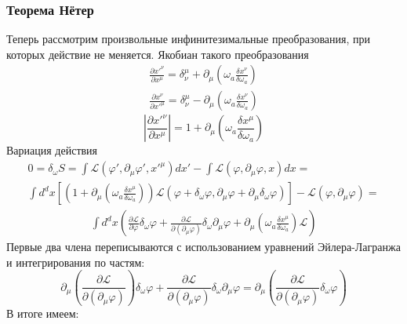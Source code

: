 \documentclass[a4paper,12pt]{article} \usepackage[utf8x]{inputenc} \usepackage[russian]{babel}
\theoremstyle{definition} \newtheorem{corollary}{Corollary}[theorem] \theoremstyle{definition}
\begin{document}
\subsubsection*{Теорема Нётер}
\label{sec:noether}

Теперь рассмотрим произвольные инфинитезимальные преобразования, при которых действие не меняется.
Якобиан такого преобразования
\begin{eqnarray*} \frac{\partial x'^{\nu}}{\partial x^{\mu}} =
\delta^{\mu}_{\nu}+\partial_{\mu}\left(\omega_a \frac{\delta x^{\nu}}{\delta \omega_a}\right)\\
\frac{\partial x^{\nu}}{\partial x'^{\mu}} = \delta^{\mu}_{\nu}-\partial_{\mu}\left(\omega_a
\frac{\delta x^{\nu}}{\delta \omega_a}\right)
\end{eqnarray*}
\begin{equation*} \left|\frac{\partial x'^{\nu}}{\partial x^{\mu}}\right| =
1+\partial_{\mu}\left(\omega_a \frac{\delta x^{\mu}}{\delta \omega_a}\right)
\end{equation*} Вариация действия
\begin{multline*} 0=\delta_{\omega} S=\int
\mathcal{L}(\varphi',\partial_{\mu}\varphi',x'^{\mu})dx'-\int
\mathcal{L}(\varphi,\partial_{\mu}\varphi,x)dx=\\ \int d^{d}x\left[ \left(
1+\partial_{\mu}\left(\omega_a \frac{\delta x^{\mu}}{\delta \omega_a}\right)\right) \mathcal{L}
\left(\varphi+\delta_{\omega}\varphi,
    \partial_{\mu}\varphi+\partial_{\mu}\delta_{\omega}\varphi\right)\right]-\mathcal{L}(\varphi,\partial_{\mu}\varphi)=
\end{multline*}
\begin{multline*} \int d^{d}x\left( \frac{\partial \mathcal{L}}{\partial \varphi}
\delta_{\omega}\varphi +\frac{\partial
\mathcal{L}}{\partial(\partial_{\mu}\varphi)}\delta_{\omega}\partial_{\mu}\varphi
+\partial_{\mu}\left(\omega_a \frac{\delta x^{\mu}}{\delta \omega_a}\right)\mathcal{L}\right)
\end{multline*} Первые два члена переписываются с использованием уравнений Эйлера-Лагранжа и
интегрирования по частям:
\begin{equation*}
  \partial_{\mu}\left(\frac{\partial \mathcal{L}}{\partial
(\partial_{\mu}\varphi)}\right)\delta_{\omega}\varphi+\frac{\partial \mathcal{L}}{\partial
(\partial_{\mu}\varphi)}\delta_{\omega}\partial_{\mu}\varphi=
    \partial_{\mu}\left(\frac{\partial
\mathcal{L}}{\partial(\partial_{\mu}\varphi)}\delta_{\omega}\varphi\right)
\end{equation*} В итоге имеем:
\end{document}

